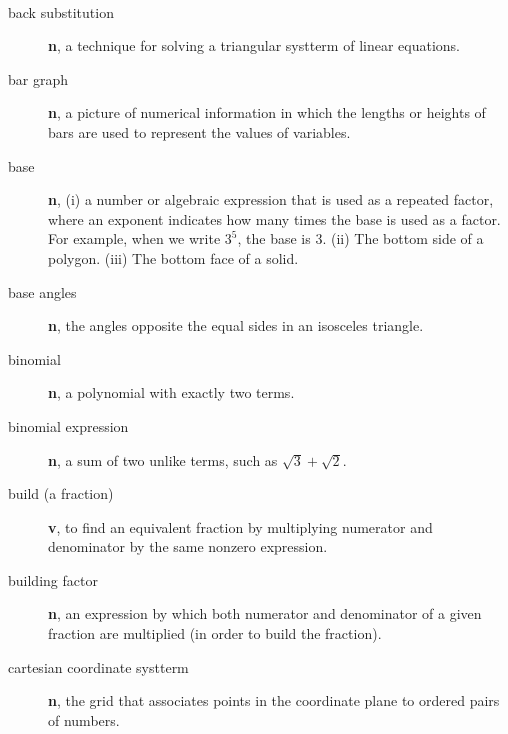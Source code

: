 \documentclass[10pt,]{book}
\newcommand{\terminology}[1]{\textbf{#1}}
\theoremstyle{plain}
\theoremstyle{definition}
\theoremstyle{definition}
\theoremstyle{definition}
\numberwithin{equation}{part}
\begin{document}
\paragraph[{}]{}\hypertarget{paragraphs-6}{}
\leavevmode%
\begin{description}
\item[{back substitution}]\hypertarget{li-475}{}\terminology{n}, a technique for solving a triangular systterm of linear equations.%
\item[{bar graph}]\hypertarget{li-476}{}\terminology{n}, a picture of numerical information in which the lengths or heights of bars are used to represent the values of variables.%
\item[{base}]\hypertarget{li-477}{}\terminology{n}, (i) a number or algebraic expression that is used as a repeated factor, where an exponent indicates how many times the base is used as a factor. For example, when we write \(3^5\), the base is \(3\). (ii) The bottom side of a polygon. (iii) The bottom face of a solid.%
\item[{base angles}]\hypertarget{li-478}{}\terminology{n}, the angles opposite the equal sides in an isosceles triangle.%
\item[{binomial}]\hypertarget{li-479}{}\terminology{n}, a polynomial with exactly two terms.%
\item[{binomial expression}]\hypertarget{li-480}{}\terminology{n}, a sum of two unlike terms, such as \(\sqrt{3}+\sqrt{2} \).%
\item[{build (a fraction)}]\hypertarget{li-481}{}\terminology{v}, to find an equivalent fraction by multiplying numerator and denominator by the same nonzero expression.%
\item[{building factor}]\hypertarget{li-482}{}\terminology{n}, an expression by which both numerator and denominator of a given fraction are multiplied (in order to build the fraction).%
\item[{cartesian coordinate systterm}]\hypertarget{li-483}{}\terminology{n}, the grid that associates points in the coordinate plane to ordered pairs of numbers.%
\end{description}
%
\typeout{************************************************}
\typeout{************************************************}
\end{document}
